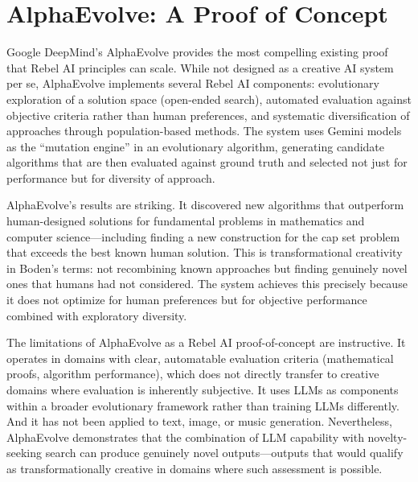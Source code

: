 \documentclass[12pt,a4paper]{article}
\begin{document}
\section{AlphaEvolve: A Proof of Concept}
Google DeepMind's AlphaEvolve \citep{novikov2025} provides the most compelling existing proof that Rebel AI principles can scale. While not designed as a creative AI system per se, AlphaEvolve implements several Rebel AI components: evolutionary exploration of a solution space (open-ended search), automated evaluation against objective criteria rather than human preferences, and systematic diversification of approaches through population-based methods. The system uses Gemini models as the ``mutation engine'' in an evolutionary algorithm, generating candidate algorithms that are then evaluated against ground truth and selected not just for performance but for diversity of approach.

AlphaEvolve's results are striking. It discovered new algorithms that outperform human-designed solutions for fundamental problems in mathematics and computer science---including finding a new construction for the cap set problem that exceeds the best known human solution. This is transformational creativity in Boden's terms: not recombining known approaches but finding genuinely novel ones that humans had not considered. The system achieves this precisely because it does not optimize for human preferences but for objective performance combined with exploratory diversity.

The limitations of AlphaEvolve as a Rebel AI proof-of-concept are instructive. It operates in domains with clear, automatable evaluation criteria (mathematical proofs, algorithm performance), which does not directly transfer to creative domains where evaluation is inherently subjective. It uses LLMs as components within a broader evolutionary framework rather than training LLMs differently. And it has not been applied to text, image, or music generation. Nevertheless, AlphaEvolve demonstrates that the combination of LLM capability with novelty-seeking search can produce genuinely novel outputs---outputs that would qualify as transformationally creative in domains where such assessment is possible.
\end{document}
